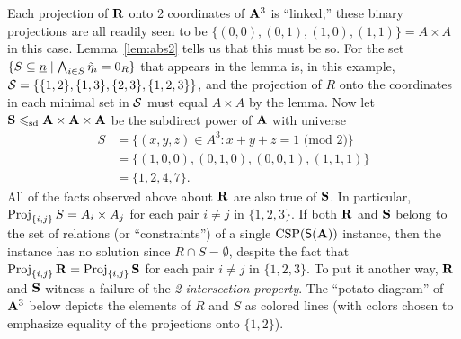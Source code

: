 {\begin{example}
  Each projection of $\mathbf{R}$ onto 2 coordinates of $\mathbf{A}^3$ is ``linked;'' 
  these binary projections are all readily seen to be
  $\{(0,0), (0,1), (1,0), (1,1)\} =  A \times A$ in this case. 
  Lemma~\ref{lem:abs2} tells us that this must be so.  For the set 
  $\{S \subseteq \underline{n}  \mid \bigwedge_{i\in S} \tilde{\eta}_i = 0_R\}$ that appears in the
  lemma is, in this example,
  $\mathcal{S} = \{\{1,2\}, \{1,3\}, \{2,3\}, \{1,2,3\}\}$, and the projection of
  $R$ onto the coordinates in each minimal  set in $\mathcal{S}$ must
  equal $A \times A$ by the lemma. 
  Now let $\mathbf{S} \leqslant_{\mathrm{sd}} \mathbf{A} \times \mathbf{A} \times \mathbf{A}$ be the subdirect power of $\mathbf{A}$
  with universe 
  \begin{align*}
    S &= \{(x,y,z)\in A^3: x+y+z=1 \text{ (mod $2$)}\}\\
    &= \{(1,0,0), (0,1,0), (0,0,1), (1,1,1) \}\\
    &= \{1, 2, 4, 7\}.
  \end{align*}
  All of the facts observed above about $\mathbf{R}$ are also true of $\mathbf{S}$.  In
  particular, $\operatorname{Proj}_{\{i,j\}} S = A_i \times A_j$ for 
  each pair $i\neq j$ in $\{1,2,3\}$.
  If both $\mathbf{R}$ and $\mathbf{S}$ belong to the set of relations 
  (or ``constraints'') of a single $\operatorname{CSP}(\mathsf{S}(\mathbf{A}))$ instance, then the instance
  has no solution since $R \cap S = \emptyset$, despite the fact that  
  $\operatorname{Proj}_{\{i,j\}}\mathbf{R} = \operatorname{Proj}_{\{i,j\}}\mathbf{S}$  for each pair $i\neq j$ in
  $\{1,2,3\}$. To put it another way, $\mathbf{R}$ and $\mathbf{S}$  
  witness a failure of the \emph{2-intersection property}. The ``potato
  diagram'' of $\mathbf{A}^3$ below depicts the elements of
  $R$ and $S$ as colored lines (with colors chosen to emphasize equality of
  the projections onto $\{1,2\}$). 


\end{example}}
